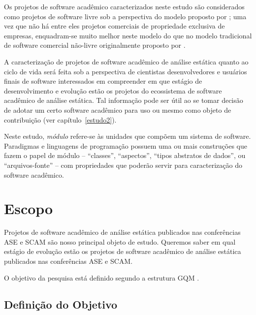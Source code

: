 Os projetos de software acadêmico caracterizados neste estudo são considerados
como projetos de software livre sob a perspectiva do modelo proposto por
; uma vez que não há entre eles projetos
comerciais de propriedade exclusiva de empresas, enquadram-se muito melhor
neste modelo do que no modelo tradicional de software comercial não-livre
originalmente proposto por .

A caracterização de projetos de software acadêmico de análise estática quanto
ao ciclo de vida será feita sob a perspectiva de cientistas desenvolvedores e
usuários finais de software interessados em compreender em que estágio de
desenvolvimento e evolução estão os projetos do ecossistema de software
acadêmico de análise estática. Tal informação pode ser 
útil ao se tomar decisão de adotar um certo software acadêmico para uso ou mesmo como
objeto de contribuição (ver capítulo~\ref{estudo2}).

Neste estudo, \textit{módulo} refere-se \`{a}s unidades que compõem um sistema de software.  
Paradigmas e linguagens de programação possuem uma ou mais
construções que fazem o papel de módulo -- ``classes'', ``aspectos'', ``tipos
abstratos de dados'', ou ``arquivos-fonte'' -- com propriedades que poderão
servir para caracterização do software acadêmico.


\section{Escopo} \label{estudo3:escopo} %

Projetos de software acadêmico de análise estática publicados nas 
conferências ASE e SCAM 
são nosso principal objeto de estudo.
Queremos saber em qual estágio de evolução estão os projetos de software
acadêmico de análise estática publicados nas conferências ASE e SCAM.

O objetivo da pesquisa está definido segundo a estrutura GQM \cite{basili1994goal}.

\subsection{Definição do Objetivo}

